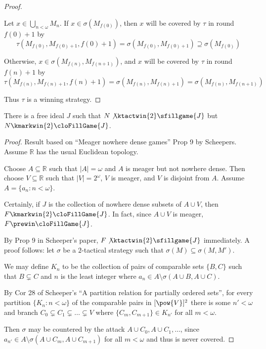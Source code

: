\begin{proof}
\begin{itemize}
          Let $x \in \bigcup_{n<\omega}M_n$. If $x\in\sigma(M_{f(0)})$, then $x$ will be covered by $\tau$ in round $f(0)+1$ by
            \[
              \tau(M_{f(0)},M_{f(0)+1},f(0)+1)
              = \sigma(M_{f(0)},M_{f(0)+1})
              \supseteq \sigma(M_{f(0)})
            \]

          Otherwise, $x\in\sigma(M_{f(n)},M_{f(n+1)})$, and $x$ will be covered by $\tau$ in round $f(n)+1$ by
            \[
              \tau(M_{f(n)},M_{f(n)+1},f(n)+1)
              = \sigma(M_{f(n)},M_{f(n)+1})
              = \sigma(M_{f(n)},M_{f(n+1)})
            \]
      \end{itemize}

      Thus $\tau$ is a winning strategy.
  \end{proof}

  \begin{ex}
    There is a free ideal $J$ such that $N\not\ktactwin{2}\sfillgame{J}$ but $N\kmarkwin{2}\cloFillGame{J}$.
  \end{ex}

  \begin{proof}
    Result based on ``Meager nowhere dense games'' Prop 9 by Scheepers. Assume $\mathbb{R}$ has the usual Euclidean topology.

    Choose $A\subseteq\mathbb{R}$ such that $|A|=\omega$ and $A$ is meager but not nowhere dense. Then choose $V\subseteq\mathbb{R}$ such that $|V|=2^\omega$, $V$ is meager, and $V$ is disjoint from $A$. Assume $A=\{a_n:n<\omega\}$.

    Certainly, if $J$ is the collection of nowhere dense subsets of $A\cup V$, then $F\kmarkwin{2}\cloFillGame{J}$. In fact, since $A\cup V$ is meager, $F\prewin\cloFillGame{J}$.

    By Prop 9 in Scheeper's paper, $F\not\ktactwin{2}\sfillgame{J}$ immediately. A proof follows: let $\sigma$ be a $2$-tactical strategy such that $\sigma(M)\subseteq\sigma(M,M')$.

    We may define $K_n$ to be the collection of pairs of comparable sets $\{B,C\}$ such that $B\subsetneq C$ and $n$ is the least integer where $a_n \in A \setminus \sigma(A\cup B,A\cup C)$.

    By Cor 28 of Scheeper's ``A partition relation for partially ordered sets'', for every partition $\{K_n:n<\omega\}$ of the comparable pairs in $[\pow{V}]^2$ there is some $n'<\omega$ and branch $C_0\subsetneq C_1\subsetneq \dots\subsetneq V$ where $\{C_m,C_{m+1}\}\in K_{n'}$ for all $m<\omega$.

    Then $\sigma$ may be countered by the attack $A\cup C_0, A\cup C_1, \dots$, since $a_{n'} \in A \setminus \sigma(A\cup C_m,A\cup C_{m+1})$ for all $m<\omega$ and thus is never covered.
  \end{proof}

















